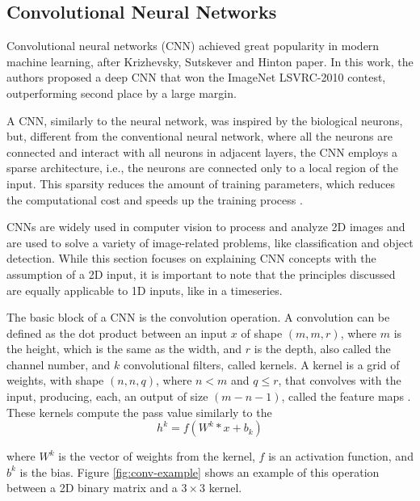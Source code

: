 \subsection{Convolutional Neural Networks} \label{section-CNN}
Convolutional neural networks (CNN) achieved great popularity in modern machine learning, after Krizhevsky, Sutskever and Hinton \cite{NIPS2012_c399862d} paper. In this work, the authors proposed a deep CNN that won the ImageNet LSVRC-2010 contest, outperforming second place by a large margin. 

A CNN, similarly to the neural network, was inspired by the biological neurons, but, different from the conventional neural network, where all the neurons are connected and interact with all neurons in adjacent layers, the CNN employs a sparse architecture, i.e., the neurons are connected only to a local region of the input. This sparsity reduces the amount of training parameters, which reduces the computational cost and speeds up the training process \cite{Alzubaidi_Zhang_Humaidi_Al_Dujaili_Duan_Al_Shamma_Santamaria_Fadhel_Al_Amidie_Farhan_2021, 9451544}. 

CNNs are widely used in computer vision to process and analyze 2D images and are used to solve a variety of image-related problems, like classification and object detection. While this section focuses on explaining CNN concepts with the assumption of a 2D input, it is important to note that the principles discussed are equally applicable to 1D inputs, like in a timeseries.

The basic block of a CNN is the convolution operation. A convolution can be defined as the dot product between an input $x$ of shape $(m,m,r)$, where $m$ is the height, which is the same as the width, and $r$ is the depth, also called the channel number, and $k$ convolutional filters, called kernels. A kernel is a grid of weights, with shape $(n,n, q)$, where $n < m$ and $q \leq r$, that convolves with the input, producing, each, an output of size $(m-n-1)$, called the feature maps \cite{Alzubaidi_Zhang_Humaidi_Al_Dujaili_Duan_Al_Shamma_Santamaria_Fadhel_Al_Amidie_Farhan_2021}. These kernels compute the pass value similarly to the 
\begin{equation}
    h^k = f\left(W^k * x + b_k\right)
\end{equation}

where $W^k$ is the vector of weights from the kernel, $f$ is an activation function, and $b^k$ is the bias. Figure \ref{fig:conv-example} shows an example of this operation between a 2D binary matrix and a $3\times3$ kernel. 


